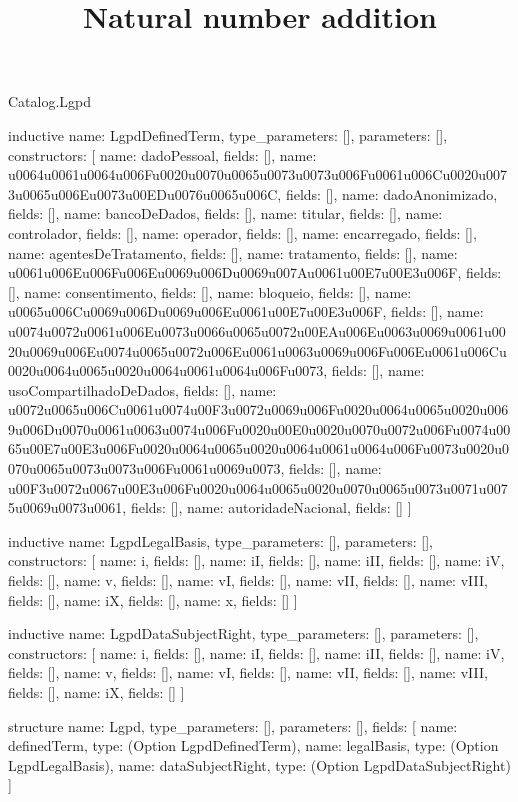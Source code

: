 \begin{lexlean}{Catalog.Lgpd}
\title{Natural number addition}
\begin{semanticmodule}
inductive{
  name: LgpdDefinedTerm,
  type_parameters: [],
  parameters: [],
  constructors: [
    {name: dadoPessoal, fields: []},
    {name: u0064u0061u0064u006Fu0020u0070u0065u0073u0073u006Fu0061u006Cu0020u0073u0065u006Eu0073u00EDu0076u0065u006C, fields: []},
    {name: dadoAnonimizado, fields: []},
    {name: bancoDeDados, fields: []},
    {name: titular, fields: []},
    {name: controlador, fields: []},
    {name: operador, fields: []},
    {name: encarregado, fields: []},
    {name: agentesDeTratamento, fields: []},
    {name: tratamento, fields: []},
    {name: u0061u006Eu006Fu006Eu0069u006Du0069u007Au0061u00E7u00E3u006F, fields: []},
    {name: consentimento, fields: []},
    {name: bloqueio, fields: []},
    {name: u0065u006Cu0069u006Du0069u006Eu0061u00E7u00E3u006F, fields: []},
    {name: u0074u0072u0061u006Eu0073u0066u0065u0072u00EAu006Eu0063u0069u0061u0020u0069u006Eu0074u0065u0072u006Eu0061u0063u0069u006Fu006Eu0061u006Cu0020u0064u0065u0020u0064u0061u0064u006Fu0073, fields: []},
    {name: usoCompartilhadoDeDados, fields: []},
    {name: u0072u0065u006Cu0061u0074u00F3u0072u0069u006Fu0020u0064u0065u0020u0069u006Du0070u0061u0063u0074u006Fu0020u00E0u0020u0070u0072u006Fu0074u0065u00E7u00E3u006Fu0020u0064u0065u0020u0064u0061u0064u006Fu0073u0020u0070u0065u0073u0073u006Fu0061u0069u0073, fields: []},
    {name: u00F3u0072u0067u00E3u006Fu0020u0064u0065u0020u0070u0065u0073u0071u0075u0069u0073u0061, fields: []},
    {name: autoridadeNacional, fields: []}
  ]
}

inductive{
  name: LgpdLegalBasis,
  type_parameters: [],
  parameters: [],
  constructors: [
    {name: i, fields: []},
    {name: iI, fields: []},
    {name: iII, fields: []},
    {name: iV, fields: []},
    {name: v, fields: []},
    {name: vI, fields: []},
    {name: vII, fields: []},
    {name: vIII, fields: []},
    {name: iX, fields: []},
    {name: x, fields: []}
  ]
}

inductive{
  name: LgpdDataSubjectRight,
  type_parameters: [],
  parameters: [],
  constructors: [
    {name: i, fields: []},
    {name: iI, fields: []},
    {name: iII, fields: []},
    {name: iV, fields: []},
    {name: v, fields: []},
    {name: vI, fields: []},
    {name: vII, fields: []},
    {name: vIII, fields: []},
    {name: iX, fields: []}
  ]
}

structure{
  name: Lgpd,
  type_parameters: [],
  parameters: [],
  fields: [
    {name: definedTerm, type: (Option LgpdDefinedTerm)},
    {name: legalBasis, type: (Option LgpdLegalBasis)},
    {name: dataSubjectRight, type: (Option LgpdDataSubjectRight)}
  ]
}
\end{semanticmodule}
\end{lexlean}
